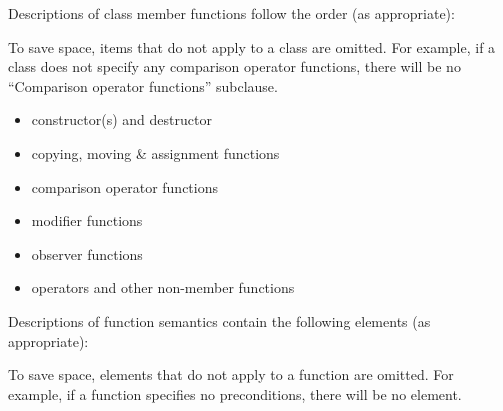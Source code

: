 \pnum
Descriptions of class member functions follow the order (as
appropriate):
\begin{footnote}
To save space, items that do not apply to a class are omitted.
For example, if a class does not specify any comparison operator functions, there
will be no ``Comparison operator functions'' subclause.
\end{footnote}

\begin{itemize}
\item constructor(s) and destructor
\item copying, moving \& assignment functions
\item comparison operator functions
\item modifier functions
\item observer functions
\item operators and other non-member functions
\end{itemize}

\pnum
Descriptions of function semantics contain the following elements (as
appropriate):
\begin{footnote}
To save space, elements that do not apply to a function are omitted.
For example, if a function specifies no
preconditions, there will be no \expects element.
\end{footnote}

